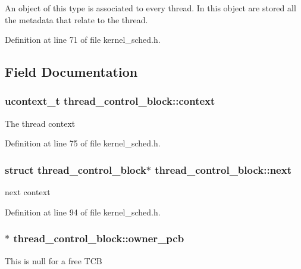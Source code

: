 An object of this type is associated to every thread. In this object are stored all the metadata that relate to the thread. 

Definition at line 71 of file kernel\-\_\-sched.\-h.



\subsection{Field Documentation}
\hypertarget{structthread__control__block_a1531cf79cdf266e2b53239177520896b}{
\subsubsection[{context}]{\setlength{\rightskip}{0pt plus 5cm}ucontext\-\_\-t thread\-\_\-control\-\_\-block\-::context}}\label{structthread__control__block_a1531cf79cdf266e2b53239177520896b}
The thread context 

Definition at line 75 of file kernel\-\_\-sched.\-h.

\hypertarget{structthread__control__block_ac6b51ca735291f730ca1d4c335fb9359}{
\subsubsection[{next}]{\setlength{\rightskip}{0pt plus 5cm}struct {\bf thread\-\_\-control\-\_\-block}$\ast$ thread\-\_\-control\-\_\-block\-::next}}\label{structthread__control__block_ac6b51ca735291f730ca1d4c335fb9359}
next context 

Definition at line 94 of file kernel\-\_\-sched.\-h.

\hypertarget{structthread__control__block_a74aa312623cb8be2bc719d5210b58c04}{
\subsubsection[{owner\-\_\-pcb}]{$\ast$ thread\-\_\-control\-\_\-block\-::owner\-\_\-pcb}}\label{structthread__control__block_a74aa312623cb8be2bc719d5210b58c04}
This is null for a free T\-C\-B 

